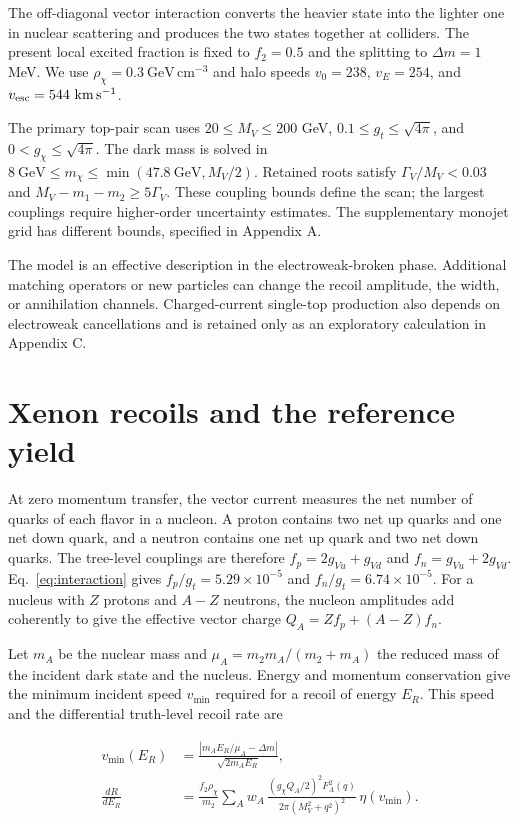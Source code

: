 \documentclass[aps,prd,reprint,superscriptaddress,longbibliography,floatfix]{revtex4-2}
\begin{document}
The off-diagonal vector interaction converts the heavier state into the lighter one in nuclear scattering and produces the two states together at colliders. The present local excited fraction is fixed to $f_2=0.5$ and the splitting to $\Delta m=1$ MeV. We use $\rho_\chi=0.3\ \mathrm{GeV\,cm^{-3}}$ and halo speeds $v_0=238$, $v_E=254$, and $v_{\rm esc}=544\ \mathrm{km\,s^{-1}}$.

The primary top-pair scan uses $20\le M_V\le200$ GeV, $0.1\le g_t\le\sqrt{4\pi}$, and $0<g_\chi\le\sqrt{4\pi}$. The dark mass is solved in $8~\mathrm{GeV}\le m_\chi\le\min(47.8~\mathrm{GeV},M_V/2)$. Retained roots satisfy $\Gamma_V/M_V<0.03$ and $M_V-m_1-m_2\ge5\Gamma_V$. These coupling bounds define the scan; the largest couplings require higher-order uncertainty estimates. The supplementary monojet grid has different bounds, specified in Appendix A.

The model is an effective description in the electroweak-broken phase. Additional matching operators or new particles can change the recoil amplitude, the width, or annihilation channels. Charged-current single-top production also depends on electroweak cancellations and is retained only as an exploratory calculation in Appendix C. \cite{kahlhoefer2016,deramo2016}

\section{Xenon recoils and the reference yield}
\label{sec:recoils}

At zero momentum transfer, the vector current measures the net number of
quarks of each flavor in a nucleon. A proton contains two net up quarks
and one net down quark, and a neutron contains one net up quark and two
net down quarks. The tree-level couplings are therefore
$f_p=2g_{Vu}+g_{Vd}$ and $f_n=g_{Vu}+2g_{Vd}$.
Eq.~\eqref{eq:interaction} gives $f_p/g_t=5.29\times10^{-5}$ and
$f_n/g_t=6.74\times10^{-5}$. For a nucleus with $Z$ protons and $A-Z$
neutrons, the nucleon amplitudes add coherently to give the effective
vector charge $Q_A=Zf_p+(A-Z)f_n$.

Let $m_A$ be the nuclear mass and $\mu_A=m_2m_A/(m_2+m_A)$ the reduced
mass of the incident dark state and the nucleus. Energy and momentum
conservation give the minimum incident speed $v_{\min}$ required for a
recoil of energy $E_R$. This speed and the differential truth-level
recoil rate are

\begin{equation}
\label{eq:recoil}
\begin{aligned}
v_{\min}(E_R)&=\frac{|m_A E_R/\mu_A-\Delta m|}{\sqrt{2m_A E_R}},\\
\frac{dR}{dE_R}&=\frac{f_2\rho_\chi}{m_2}\sum_A w_A\,
\frac{(g_\chi Q_A/2)^2 F_A^2(q)}{2\pi(M_V^2+q^2)^2}\,\eta(v_{\min}).
\end{aligned}
\end{equation}
\end{document}
